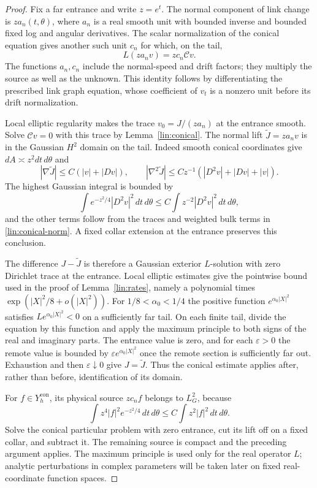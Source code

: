 \begin{proof}
Fix a far entrance and write $z=e^t$.  The normal component of link
change is $z a_n(t,\theta)$, where $a_n$ is a real smooth unit with
bounded inverse and bounded fixed log and angular derivatives.  The
scalar normalization of the conical equation gives another such unit
$c_n$ for which, on the tail,
\[
 L(z a_n v)=z c_n\mathcal Cv.
\]
The functions $a_n,c_n$ include the normal-speed and drift factors;
they multiply the source as well as the unknown.  This identity follows
by differentiating the prescribed link graph equation, whose coefficient
of $v_t$ is a nonzero unit before its drift normalization.

Local elliptic regularity makes the trace
$v_0=J/(z a_n)$ at the entrance smooth.  Solve
$\mathcal Cv=0$ with this trace by Lemma~\ref{lin:conical}.  The normal
lift $\widetilde J=z a_n v$ is in the Gaussian $H^2$ domain on the tail.
Indeed smooth conical coordinates give $dA\asymp z^2dt\,d\theta$ and
\[
 |\nabla\widetilde J|\le C(|v|+|Dv|),\qquad
 |\nabla^2\widetilde J|
       \le Cz^{-1}(|D^2v|+|Dv|+|v|).
\]
The highest Gaussian integral is bounded by
\[
 \int e^{-z^2/4}|D^2v|^2\,dt\,d\theta
       \le C\int z^{-2}|D^2v|^2\,dt\,d\theta,
\]
and the other terms follow from the traces and weighted bulk terms in
\eqref{lin:conical-norm}.  A fixed collar extension at the entrance
preserves this conclusion.

The difference $J-\widetilde J$ is therefore a Gaussian exterior
$L$-solution with zero Dirichlet trace at the entrance.  Local elliptic
estimates give the pointwise bound used in the proof of
Lemma~\ref{lin:rates}, namely a polynomial times
$\exp(|X|^2/8+o(|X|^2))$.  For $1/8<\alpha_0<1/4$ the positive function
$e^{\alpha_0|X|^2}$ satisfies $Le^{\alpha_0|X|^2}<0$ on a sufficiently
far tail.  On each finite tail, divide the equation by this function
and apply the maximum principle to both signs of the real and imaginary
parts.  The entrance value is zero, and for each $\varepsilon>0$ the
remote value is bounded by $\varepsilon e^{\alpha_0|X|^2}$ once the
remote section is sufficiently far out.  Exhaustion and then
$\varepsilon\downarrow0$ give $J=\widetilde J$.  Thus the conical estimate
applies after, rather than before, identification of its domain.

For $f\in Y^{\mathrm{con}}_h$, its physical source $z c_n f$ belongs
to $L^2_G$, because
\[
 \int z^4|f|^2e^{-z^2/4}\,dt\,d\theta
       \le C\int z^2|f|^2\,dt\,d\theta.
\]
Solve the conical particular problem with zero entrance, cut its lift
off on a fixed collar, and subtract it.  The remaining source is
compact and the preceding argument applies.  The maximum principle
is used only for the real operator $L$; analytic perturbations in
complex parameters will be taken later on fixed real-coordinate
function spaces.
\end{proof}


